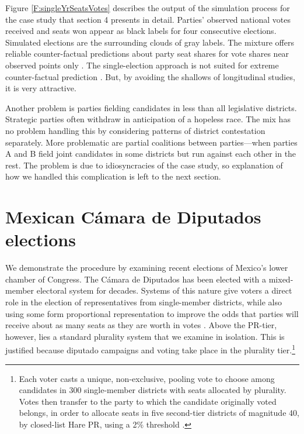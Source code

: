 \documentclass[letter,12pt]{article}
\begin{document}
Figure \ref{F:singleYrSeatsVotes} describes the output of the simulation process for the case study that section 4 presents in detail. Parties' observed national votes received and seats won appear as black labels for four consecutive elections. Simulated elections are the surrounding clouds of gray labels. The mixture offers reliable counter-factual predictions about party seat shares for vote shares near observed points only \citep[about $\pm5$ percent,][:fn.\ 8]{linzerSeatVoteElasticity2012}. The single-election approach is not suited for extreme counter-factual prediction \citep[something generally true for any approach,][]{gelman.king.1994EvalElSysRedis}. But, by avoiding the shallows of longitudinal studies, it is very attractive.


Another problem is parties fielding candidates in less than all legislative districts. Strategic parties often withdraw in anticipation of a hopeless race. The mix has no problem handling this by considering patterns of district contestation separately. More problematic are partial coalitions between parties---when parties A and B field joint candidates in some districts but run against each other in the rest. The problem is due to idiosyncracies of the case study, so explanation of how we handled this complication is left to the next section. 

\section{Mexican C\'amara de Diputados elections}


We demonstrate the procedure by examining recent elections of Mexico's lower chamber of Congress. The C\'amara de Diputados has been elected with a mixed-member electoral system for decades. Systems of this nature give voters a direct role in the election of representatives from single-member districts, while also using some form proportional representation to improve the odds that parties will receive about as many seats as they are worth in votes \citep{shugart.wattenbergIntro2001}. Above the PR-tier, however, lies a standard plurality system that we examine in isolation. This is justified because diputado campaigns and voting take place in the plurality tier.\footnote{Each voter casts a unique, non-exclusive, pooling vote to choose among candidates in 300 single-member districts with seats allocated by plurality. Votes then transfer to the party to which the candidate originally voted belongs, in order to allocate seats in five second-tier districts of magnitude 40, by closed-list Hare PR, using a 2\% threshold \citep{weldonMixedMemberSys2001}.}
\end{document}
